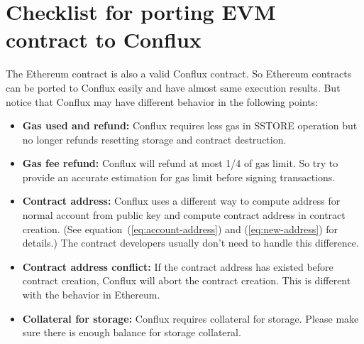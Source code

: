 \documentclass[fleqn,10pt]{SelfArx} %
\begin{document}






\newpage
\appendix

\section{Checklist for porting EVM contract to Conflux}

The Ethereum contract is also a valid Conflux contract. So Ethereum contracts can be ported to Conflux easily and have almost same execution results. But notice that Conflux may have different behavior in the following points:
\begin{itemize}
	\item {\bf Gas used and refund:} Conflux requires less gas in SSTORE operation but no longer refunds resetting storage and contract destruction. 
	\item {\bf Gas fee refund:} Conflux will refund at most 1/4 of gas limit. So try to provide an accurate estimation for gas limit before signing transactions. 
	\item {\bf Contract address:} Conflux uses a different way to compute address for normal account from public key and compute contract address in contract creation. (See equation~(\ref{eq:account-address}) and (\ref{eq:new-address}) for details.) The contract developers usually don't need to handle this difference. 
	\item {\bf Contract address conflict:} If the contract address has existed before contract creation, Conflux will abort the contract creation. This is different with the behavior in Ethereum. 
	\item {\bf Collateral for storage:} Conflux requires collateral for storage. Please make sure there is enough balance for storage collateral. 

\end{itemize}

\end{document}
